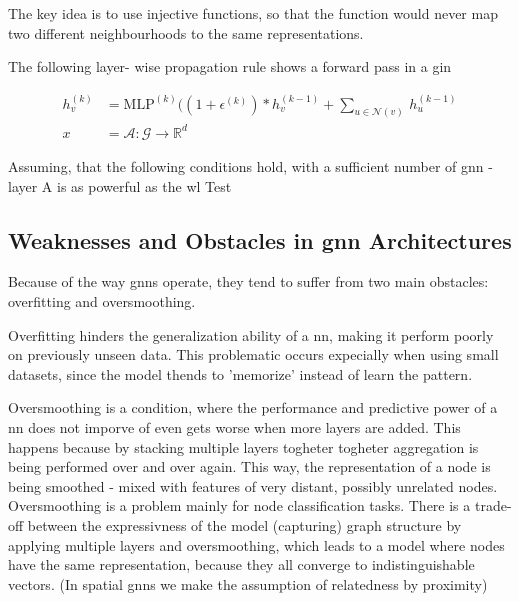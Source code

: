The key idea is to use injective functions, so that the function would never map two different
neighbourhoods to the same representations. \cite{Xu2019}

The following layer- wise propagation rule shows a forward pass in a \ac{gin}

\begin{align*}
    h^{(k)}_{v} & = \mathrm{MLP}^{(k)} ((1 + \epsilon^{(k)}) *h^{(k-1)}_{v} + \sum_{{u} \in{\mathcal{N}(v)}} \,h^{(k-1)}_{u} \\
    x           & = \mathcal{A}: \mathcal{G} \rightarrow\mathbb{R}^{d}
\end{align*}





Assuming, that the following conditions hold, with a sufficient number
of \ac{gnn} - layer A is as powerful as the \ac{wl} Test




\subsection{Weaknesses and Obstacles in \ac{gnn} Architectures}
\label{sec:related:pred:typical}
Because of the way \acp{gnn} operate, they tend to suffer from two main obstacles:
overfitting and oversmoothing.

Overfitting hinders the generalization ability of a \acf{nn}, making it perform poorly
on previously unseen data. This problematic occurs expecially when using small datasets,
since the model thends to 'memorize' instead of learn the pattern.


Oversmoothing is a condition, where the performance and predictive power of a \ac{nn}
does not imporve of even gets worse when more layers are added. This happens because
by stacking multiple layers  togheter togheter aggregation is being performed over and over again.
This way, the representation of a node is being smoothed - mixed with features of
very distant, possibly unrelated nodes. Oversmoothing is a problem mainly for node classification
tasks. There is a trade-off between the expressivness of the model (capturing) graph structure by
applying multiple layers and oversmoothing, which leads to a model where nodes have the same representation,
because they all converge to indistinguishable vectors.\cite{Zhou2020}\cite{DBLP:journals/corr/abs-2006-04064}
(In spatial \acp{gnn} we make the assumption of relatedness by proximity)


